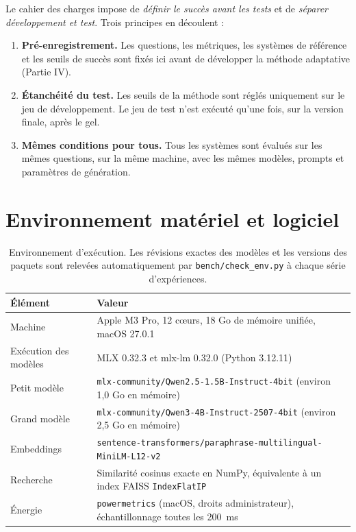 \documentclass[11pt,a4paper]{article}
\begin{document}
Le cahier des charges impose de \emph{définir le succès avant les tests} et de \emph{séparer
développement et test}. Trois principes en découlent :
\begin{enumerate}
\item \textbf{Pré-enregistrement.} Les questions, les métriques, les systèmes de référence et les seuils
de succès sont fixés ici avant de développer la méthode adaptative (Partie IV).
\item \textbf{Étanchéité du test.} Les seuils de la méthode sont réglés uniquement sur le jeu de
développement. Le jeu de test n'est exécuté qu'une fois, sur la version finale, après le gel.
\item \textbf{Mêmes conditions pour tous.} Tous les systèmes sont évalués sur les mêmes questions, sur la
même machine, avec les mêmes modèles, prompts et paramètres de génération.
\end{enumerate}

\section{Environnement matériel et logiciel}\label{sec:env}

\begin{table}[H]
\centering\small
\begin{tabularx}{\textwidth}{l Y}
\toprule
\textbf{Élément} & \textbf{Valeur} \\
\midrule
Machine & Apple M3 Pro, 12 cœurs, 18 Go de mémoire unifiée, macOS 27.0.1 \\
Exécution des modèles & MLX 0.32.3 et mlx-lm 0.32.0 (Python 3.12.11) \\
Petit modèle & \texttt{mlx-community/Qwen2.5-1.5B-Instruct-4bit} (environ 1,0 Go en mémoire) \\
Grand modèle & \texttt{mlx-community/Qwen3-4B-Instruct-2507-4bit} (environ 2,5 Go en mémoire) \\
Embeddings & \texttt{sentence-transformers/paraphrase-multilingual-MiniLM-L12-v2} \\
Recherche & Similarité cosinus exacte en NumPy, équivalente à un index FAISS \texttt{IndexFlatIP} \\
Énergie & \texttt{powermetrics} (macOS, droits administrateur), échantillonnage toutes les 200~ms \\
\bottomrule
\end{tabularx}
\caption{Environnement d'exécution. Les révisions exactes des modèles et les versions des paquets sont
relevées automatiquement par \texttt{bench/check\_env.py} à chaque série d'expériences.}
\label{tab:env}
\end{table}
\end{document}

